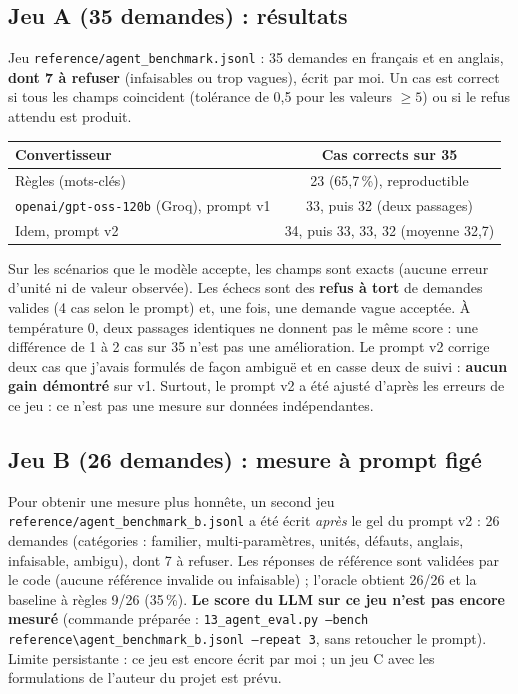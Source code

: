 \documentclass[11pt,a4paper]{article}
\newcommand{\code}[1]{\texttt{#1}}
\begin{document}
\subsection{Jeu A (35 demandes) : r\'esultats}
Jeu \code{reference/agent\_benchmark.jsonl} : 35 demandes en fran\c cais et en anglais, \textbf{dont 7 \`a refuser} (infaisables ou trop vagues), \'ecrit par moi. Un cas est correct si tous les champs coincident
(tol\'erance de 0,5 pour les valeurs $\ge5$) ou si le refus attendu est produit.
\begin{center}\small\begin{tabular}{@{}lc@{}}\toprule
Convertisseur & Cas corrects sur 35 \\\midrule
R\`egles (mots-cl\'es) & 23 (65,7\,\%), reproductible \\
\code{openai/gpt-oss-120b} (Groq), prompt v1 & 33, puis 32 (deux passages) \\
Idem, prompt v2 & 34, puis 33, 33, 32 (moyenne 32,7) \\
\bottomrule\end{tabular}\end{center}
\begin{honnete}
Sur les sc\'enarios que le mod\`ele accepte, les champs sont exacts (aucune erreur d'unit\'e ni de valeur observ\'ee). Les \'echecs sont des \textbf{refus \`a tort} de demandes valides (4 cas selon le prompt)
et, une fois, une demande vague accept\'ee. \`A temp\'erature 0, deux passages identiques ne donnent pas le m\^eme score : une diff\'erence de 1 \`a 2 cas sur 35 n'est pas une am\'elioration.
Le prompt v2 corrige deux cas que j'avais formul\'es de fa\c con ambigu\"e et en casse deux de suivi : \textbf{aucun gain d\'emontr\'e} sur v1.
Surtout, le prompt v2 a \'et\'e ajust\'e d'apr\`es les erreurs de ce jeu : ce n'est pas une mesure sur donn\'ees ind\'ependantes.
\end{honnete}

\subsection{Jeu B (26 demandes) : mesure \`a prompt fig\'e}
Pour obtenir une mesure plus honn\^ete, un second jeu \code{reference/agent\_benchmark\_b.jsonl} a \'et\'e \'ecrit \emph{apr\`es} le gel du prompt v2 : 26 demandes (cat\'egories : familier, multi-param\`etres, unit\'es, d\'efauts, anglais,
infaisable, ambigu), dont 7 \`a refuser. Les r\'eponses de r\'ef\'erence sont valid\'ees par le code (aucune r\'ef\'erence invalide ou infaisable) ; l'oracle obtient 26/26 et la baseline \`a r\`egles 9/26 (35\,\%).
\textbf{Le score du LLM sur ce jeu n'est pas encore mesur\'e} (commande pr\'epar\'ee : \code{13\_agent\_eval.py --bench reference\textbackslash agent\_benchmark\_b.jsonl --repeat 3}, sans retoucher le prompt).
Limite persistante : ce jeu est encore \'ecrit par moi ; un jeu C avec les formulations de l'auteur du projet est pr\'evu.
\end{document}
